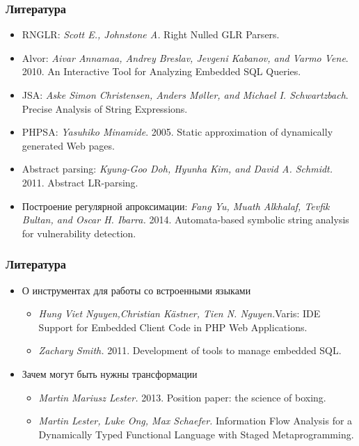 \documentclass{beamer}
\begin{document}
\begin{frame}
	\transwipe[direction=90]
	\frametitle{Литература}
	\begin{itemize}
		\item RNGLR: \emph{Scott E., Johnstone A.} Right Nulled GLR Parsers.
		\item Alvor: \emph{Aivar Annamaa, Andrey Breslav, Jevgeni Kabanov, and Varmo Vene}. 2010. An Interactive Tool for Analyzing Embedded SQL Queries.
		\item JSA: \emph{Aske Simon Christensen, Anders Møller, and Michael I. Schwartzbach}. Precise Analysis of String Expressions.
    \item PHPSA: \emph{Yasuhiko Minamide}. 2005. Static approximation of dynamically generated Web pages.
    \item Abstract parsing: \emph{Kyung-Goo Doh, Hyunha Kim, and David A. Schmidt.} 2011. Abstract LR-parsing.
    \item Построение регулярной апроксимации: \emph{Fang Yu, Muath Alkhalaf, Tevfik Bultan, and Oscar H. Ibarra.} 2014. Automata-based symbolic string analysis for vulnerability detection.
	\end{itemize}
\end{frame}

\begin{frame}
	\transwipe[direction=90]
	\frametitle{Литература}
	\begin{itemize}
    \item О инструментах для работы со встроенными языками
      \begin{itemize}
        \item \emph{Hung Viet Nguyen,Christian Kästner, Tien N. Nguyen.}Varis: IDE Support for Embedded Client Code in PHP Web Applications.
        \item \emph{Zachary Smith.} 2011. Development of tools to manage embedded SQL.
      \end{itemize}
    \item Зачем могут быть нужны трансформации
      \begin{itemize}
        \item \emph{Martin Mariusz Lester.} 2013. Position paper: the science of boxing.
        \item \emph{Martin Lester, Luke Ong, Max Schaefer.} Information Flow Analysis for a Dynamically Typed Functional Language with Staged Metaprogramming.
      \end{itemize}
	\end{itemize}
\end{frame}
\end{document}
